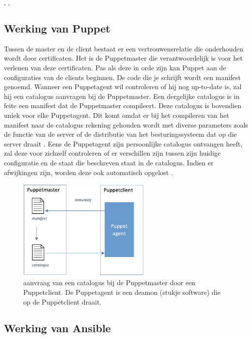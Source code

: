  \textcite{languagePuppet}, \textcite{masterproef}, \textcite{ansibledoc}

\subsection{Werking van Puppet}

Tussen de master en de client bestaat er een vertrouwensrelatie die onderhouden wordt door certificaten. Het is de Puppetmaster die verantwoordelijk is voor het verlenen van deze certificaten. Pas als deze in orde zijn kan Puppet  aan de configuraties van de clients beginnen. De code die je schrijft wordt een manifest genoemd. Wanneer een Puppetagent wil controleren of hij nog up-to-date is, zal hij een catalogus aanvragen bij de Puppetmaster. Een dergelijke catalogus is in feite een manifest dat de Puppetmaster compileert. Deze catalogus is bovendien uniek voor elke Puppetagent. Dit komt omdat er bij het compileren van het manifest naar de catalogus rekening gehouden wordt met diverse parameters zoals de functie van de server of de distributie van het besturingssysteem dat op die server draait \autocite{Puppetlanguagecatalog}. Eens de Puppetagent zijn persoonlijke catalogus ontvangen heeft, zal deze voor zichzelf controleren of er verschillen zijn tussen zijn huidige configuratie en de staat die beschreven staat in de catalogus. Indien er afwijkingen zijn, worden deze ook automatisch opgelost \autocite{puppetdoc}.

\begin{figure}  \begin{center}
  \includegraphics[width=250px]{img/aanvraagCatalogus.png}
 \end{center}\caption{aanvraag van een catalogus bij de Puppetmaster door een Puppetclient. De Puppetagent is een deamon (stukje software) die op de Puppetclient draait.}  
  \label{fig:aanvraagCatalogus}
\end{figure}


\subsection{Werking van Ansible}

